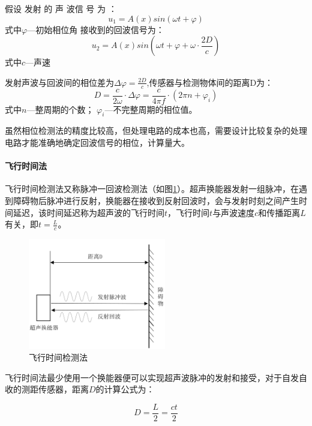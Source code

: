     假设 发射 的 声 波信 号 为 ：
    \begin{equation}
    	u_1=A(x)sin(\omega t + \varphi)
    \end{equation}
式中\quad$\varphi$---初始相位角
接收到的回波信号为：
\begin{equation}
	u_2=A(x)sin(\omega t + \varphi + \omega \cdot{\frac{2D}{c}})
\end{equation}
式中\quad$c$---声速\par
发射声波与回波间的相位差为$\Delta \varphi=\frac{2D}{c}$,传感器与检测物体间的距离D为：
\begin{equation}
	D=\frac{c}{2\omega}\cdot \Delta \varphi=\frac{c}{4\pi f}\cdot(2\pi n + \varphi_i)
\end{equation}
式中\quad$n$---整周期的个数；
\quad$\varphi_i$---不完整周期的相位值。\par
虽然相位检测法的精度比较高，但处理电路的成本也高，需要设计比较复杂的处理电路才能准确地确定回波信号的相位，计算量大。\par



    
    \paragraph{飞行时间法}
    飞行时间检测法又称脉冲一回波检测法（如图\ref{飞行时间检测法}）。超声换能器发射一组脉冲，在遇到障碍物后脉冲进行反射，换能器在接收到反射回波时，会与发射时刻之间产生时间延迟，该时间延迟称为超声波的飞行时间$t$，飞行时间$t$与声波速度$c$和传播距离$L$有关，即$t=\frac{L}{c}$。
    \begin{figure}[!h]
    	\centering
    	\includegraphics[width=6cm]{figure/飞行时间检测法.png}
    	\caption{飞行时间检测法}
    	\label{飞行时间检测法}
    \end{figure}\par
    飞行时间法最少使用一个换能器便可以实现超声波脉冲的发射和接受，对于自发自收的测距传感器，距离$D$的计算公式为：
    
    \begin{equation}
    	D=\frac{L}{2}=\frac{ct}{2}
    \end{equation}\par

